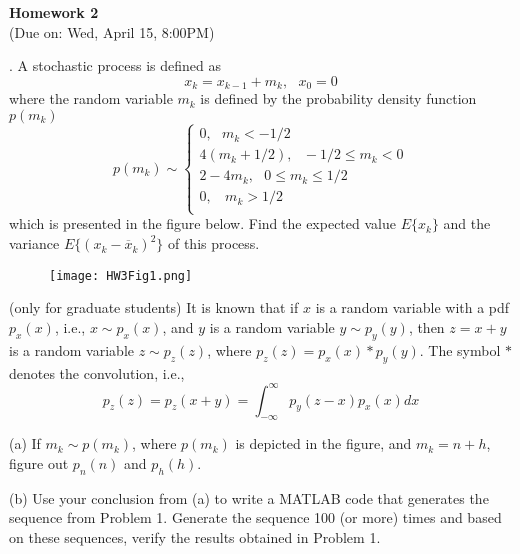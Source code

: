 \documentclass{article}
\begin{document}
 
\begin{center}
{\bf \Large  Homework 2} \\
(Due on: Wed, April 15, 8:00PM)
\end{center}

. A stochastic process is defined as
\begin{equation}
 x_{k}=x_{k-1}+m_k,\ \ \ x_{0}=0
\end{equation}
where the random variable $m_k$ is defined by the probability density function $p(m_k)$
\begin{equation}
  p(m_{k}) \sim \left\{
    \begin{array}{l}
       0, \ \ \ m_k < -1/2 \\
       4(m_k+1/2), \ \ \ -1/2 \le m_k < 0 \\
       2-4m_k, \ \ \ 0 \le  m_k \le 1/2 \\
       0, \ \ \ \ m_k > 1/2 \\
    \end{array} \right.
\end{equation}
which is presented in the figure below. Find the expected value $E\{x_k\}$ and 
the variance $E\{(x_k-\overline{x}_k)^2\}$ of this process.
\begin{figure}[h]
\begin{center}
\texttt{[image: HW3Fig1.png]}
\end{center}
\end{figure}

 (only for graduate students) It is known that if 
$x$ is a random variable with a pdf $p_x(x)$, i.e., $x \sim p_x(x)$,  
and $y$ is a random variable $y \sim p_y(y)$, then 
$z=x+y$ is a random variable $z \sim p_z(z)$, where $p_z(z)=p_x(x)*p_y(y)$. 
The symbol  $*$ denotes the convolution, i.e.,
\begin{equation}
  p_z(z)=p_z(x+y)=\int_{-\infty}^\infty p_y(z-x)p_x(x)dx
\end{equation}

(a) If $m_k \sim p(m_k)$, where $p(m_k)$ is depicted  in
 the figure, and $m_k=n+h$, figure out $p_n(n)$ and 
$p_h(h)$. 

(b) Use your conclusion from (a) to write a MATLAB code that
generates the sequence from Problem 1. Generate the sequence 
100 (or more) times and based on these sequences, verify the
results obtained in Problem 1.
\end{document}
